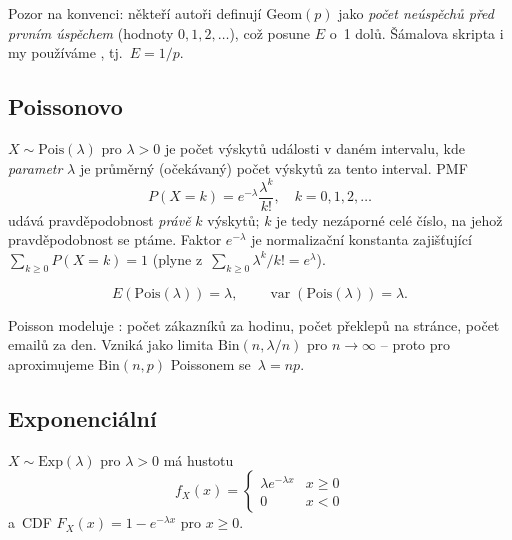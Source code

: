 \documentclass[11pt,a4paper]{article}
\DeclareMathOperator{\Var}{var}
\begin{document}
\begin{poznamka}
Pozor na konvenci: někteří autoři definují $\mathrm{Geom}(p)$ jako \emph{počet neúspěchů před prvním úspěchem} (hodnoty $0,1,2,\dots$), což posune $E$ o~1 dolů. Šámalova skripta i my používáme , tj.\ $E=1/p$.
\end{poznamka}

\subsection{Poissonovo}

\begin{definice}
$X\sim\mathrm{Pois}(\lambda)$ pro $\lambda>0$ je počet výskytů události v daném intervalu, kde \emph{parametr} $\lambda$ je průměrný (očekávaný) počet výskytů za tento interval. PMF
\[
P(X=k)=e^{-\lambda}\frac{\lambda^k}{k!},\quad k=0,1,2,\dots
\]
udává pravděpodobnost \emph{právě} $k$ výskytů; $k$ je tedy nezáporné celé číslo, na jehož pravděpodobnost se ptáme. Faktor $e^{-\lambda}$ je normalizační konstanta zajišťující $\sum_{k\ge0}P(X=k)=1$ (plyne z~$\sum_{k\ge0}\lambda^k/k!=e^{\lambda}$).
\end{definice}

\begin{veta}
\[
E(\mathrm{Pois}(\lambda))=\lambda,\qquad \Var(\mathrm{Pois}(\lambda))=\lambda.
\]
\end{veta}

\begin{intuice}
Poisson modeluje : počet zákazníků za hodinu, počet překlepů na stránce, počet emailů za den. Vzniká jako limita $\mathrm{Bin}(n,\lambda/n)$ pro $n\to\infty$ -- proto pro  aproximujeme $\mathrm{Bin}(n,p)$ Poissonem se~$\lambda=np$.
\end{intuice}

\subsection{Exponenciální}

\begin{definice}
$X\sim\mathrm{Exp}(\lambda)$ pro $\lambda>0$ má hustotu
\[
f_X(x)=\begin{cases}\lambda e^{-\lambda x} & x\ge 0\\ 0 & x<0\end{cases}
\]
a~CDF $F_X(x)=1-e^{-\lambda x}$ pro $x\ge 0$.
\end{definice}
\end{document}
